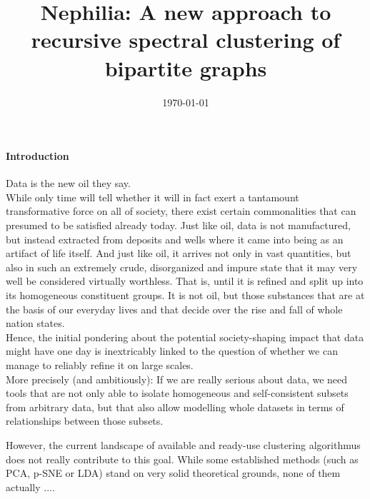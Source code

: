 \documentclass[10pt, a4paper, twocolumn]{article} %
\title{Nephilia: A new approach to recursive spectral clustering of bipartite graphs} %
\author{
	\authorstyle{Florian Schaefer}
}
\date{\today} %
\begin{document}
\maketitle %

\thispagestyle{firstpage} %




\paragraph{Introduction}
Data is the new oil they say.
\\
While only time will tell whether it will in fact exert a tantamount transformative force on all of society, there exist
certain commonalities that can presumed to be satisfied already today.
Just like oil, data is not manufactured, but instead extracted from deposits and wells where it came into being as an
artifact of life itself.
And just like oil, it arrives not only in vast quantities, but also in such an extremely crude, disorganized and impure
state that it may very well be considered virtually worthless.
That is, until it is refined and split up into its homogeneous constituent groups.
It is not oil, but those substances that are at the basis of our everyday lives and that decide over the rise and fall
of whole nation states.
\\
Hence, the initial pondering about the potential society-shaping impact that data might have one day is inextricably
linked to the question of whether we can manage to reliably refine it on large scales.
\\
More precisely (and ambitiously): If we are really serious about data, we need tools that are not only able to isolate
homogeneous and self-consistent subsets from arbitrary data, but that also allow modelling whole datasets in terms of
relationships between those subsets.

However, the current landscape of available and ready-use clustering algorithmus does not really contribute to this goal.
While some established methods (such as PCA, p-SNE or LDA) stand on very solid theoretical grounds, none of them
actually ....
\end{document}
